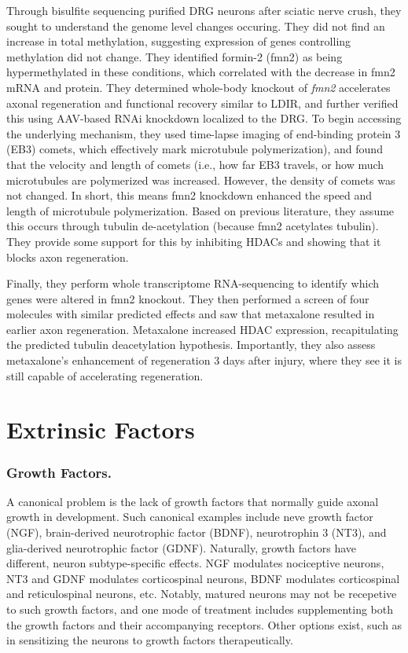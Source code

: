Through bisulfite sequencing purified DRG neurons after sciatic nerve crush, they sought to understand the genome level changes occuring. They did not find an increase in total methylation, suggesting expression of genes controlling methylation did not change. They identified formin-2 (fmn2) as being hypermethylated in these conditions, which correlated with the decrease in fmn2 mRNA and protein. They determined whole-body knockout of \textit{fmn2} accelerates axonal regeneration and functional recovery similar to LDIR, and further verified this using AAV-based RNAi knockdown localized to the DRG. To begin accessing the underlying mechanism, they used time-lapse imaging of end-binding protein 3 (EB3) comets, which effectively mark microtubule polymerization), and found that the velocity and length of comets (i.e., how far EB3 travels, or how much microtubules are polymerized was increased. However, the density of comets was not changed. In short, this means fmn2 knockdown enhanced the speed and length of microtubule polymerization. Based on previous literature, they assume this occurs through tubulin de-acetylation (because fmn2 acetylates tubulin). They provide some support for this by inhibiting HDACs and showing that it blocks axon regeneration. \newline

Finally, they perform whole transcriptome RNA-sequencing to identify which genes were altered in fmn2 knockout. They then performed a screen of four molecules with similar predicted effects and saw that metaxalone resulted in earlier axon regeneration. Metaxalone increased HDAC expression, recapitulating the predicted tubulin deacetylation hypothesis. Importantly, they also assess metaxalone's enhancement of regeneration 3 days after injury, where they see it is still capable of accelerating regeneration. 





\section{Extrinsic Factors}

\subsubsection{Growth Factors.}

A canonical problem is the lack of growth factors that normally guide axonal growth in development. Such canonical examples include neve growth factor (NGF), brain-derived neurotrophic factor (BDNF), neurotrophin 3 (NT3), and glia-derived neurotrophic factor (GDNF). Naturally, growth factors have different, neuron subtype-specific effects. NGF modulates nociceptive neurons, NT3 and GDNF modulates corticospinal neurons, BDNF modulates corticospinal and reticulospinal neurons, etc. Notably, matured neurons may not be recepetive to such growth factors, and one mode of treatment includes supplementing both the growth factors and their accompanying receptors. Other options exist, such as in sensitizing the neurons to growth factors therapeutically.\newline

